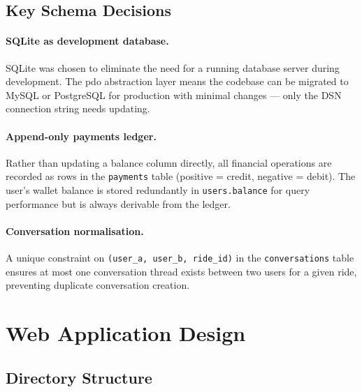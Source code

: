 \documentclass[12pt,a4paper,openright]{report}
\begin{document}
\subsection{Key Schema Decisions}

\paragraph{SQLite as development database.} SQLite was chosen to eliminate the need for a running database server during development. The \gls{pdo} abstraction layer means the codebase can be migrated to MySQL or PostgreSQL for production with minimal changes — only the DSN connection string needs updating.

\paragraph{Append-only payments ledger.} Rather than updating a balance column directly, all financial operations are recorded as rows in the \texttt{payments} table (positive = credit, negative = debit). The user's wallet balance is stored redundantly in \texttt{users.balance} for query performance but is always derivable from the ledger.

\paragraph{Conversation normalisation.} A unique constraint on \texttt{(user\_a, user\_b, ride\_id)} in the \texttt{conversations} table ensures at most one conversation thread exists between two users for a given ride, preventing duplicate conversation creation.

\section{Web Application Design}

\subsection{Directory Structure}
\end{document}
